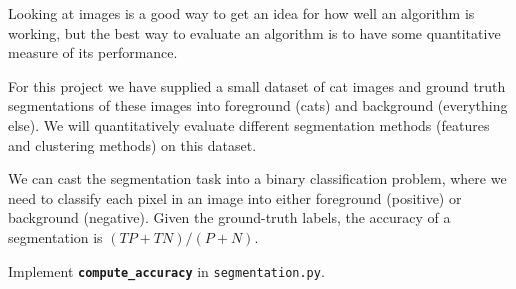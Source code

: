 \documentclass[11pt]{article}
\begin{document}
Looking at images is a good way to get an idea for how well an algorithm
is working, but the best way to evaluate an algorithm is to have some
quantitative measure of its performance.

For this project we have supplied a small dataset of cat images and
ground truth segmentations of these images into foreground (cats) and
background (everything else). We will quantitatively evaluate different
segmentation methods (features and clustering methods) on this dataset.

We can cast the segmentation task into a binary classification problem,
where we need to classify each pixel in an image into either foreground
(positive) or background (negative). Given the ground-truth labels, the
accuracy of a segmentation is \((TP+TN)/(P+N)\).

Implement \textbf{\texttt{compute\_accuracy}} in
\texttt{segmentation.py}.
\end{document}
